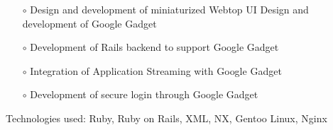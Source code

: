 \documentclass{scrartcl}
\begin{document}
\begin{cv}{
\href{http://www.develmj.com}{}
}
{\begin{itemize}
{\begin{itemize}
    \item[\footnotesize$\circ$] Design and development of miniaturized Webtop UI
    Design and development of Google Gadget
    \item[\footnotesize$\circ$] Development of Rails backend to support Google Gadget
    \item[\footnotesize$\circ$] Integration of Application Streaming with Google Gadget
    \item[\footnotesize$\circ$] Development of secure login through
      Google Gadget
    \end{itemize}}
    Technologies used: Ruby, Ruby on Rails, XML, NX, Gentoo Linux,
    Nginx
\end{itemize}
}

\vspace{0.5em}


\end{cv}
\end{document}
